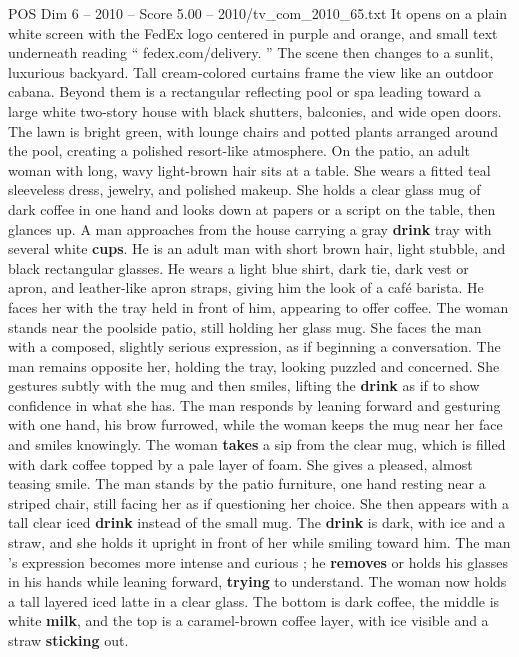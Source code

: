 \begin{textsample}{POS Dim 6 – 2010 – Score 5.00 – 2010/tv\_com\_2010\_65.txt}  \label{ex:f6_pos_089}
It opens on a plain white screen with the FedEx logo centered in purple and orange, and small text underneath reading “ fedex.com/delivery. ” The scene then changes to a sunlit, luxurious backyard.
Tall cream-colored curtains frame the view like an outdoor cabana.
Beyond them is a rectangular reflecting pool or spa leading toward a large white two-story house with black shutters, balconies, and wide open doors.
The lawn is bright green, with lounge chairs and potted plants arranged around the pool, creating a polished resort-like atmosphere.
On the patio, an adult woman with long, wavy light-brown hair sits at a table.
She wears a fitted teal sleeveless dress, jewelry, and polished makeup.
She holds a clear glass mug of dark coffee in one hand and looks down at papers or a script on the table, then glances up.
A man approaches from the house carrying a gray \textbf{drink} tray with several white \textbf{cups}.
He is an adult man with short brown hair, light stubble, and black rectangular glasses.
He wears a light blue shirt, dark tie, dark vest or apron, and leather-like apron straps, giving him the look of a café barista.
He faces her with the tray held in front of him, appearing to offer coffee.
The woman stands near the poolside patio, still holding her glass mug.
She faces the man with a composed, slightly serious expression, as if beginning a conversation.
The man remains opposite her, holding the tray, looking puzzled and concerned.
She gestures subtly with the mug and then smiles, lifting the \textbf{drink} as if to show confidence in what she has.
The man responds by leaning forward and gesturing with one hand, his brow furrowed, while the woman keeps the mug near her face and smiles knowingly.
The woman \textbf{takes} a sip from the clear mug, which is filled with dark coffee topped by a pale layer of foam.
She gives a pleased, almost teasing smile.
The man stands by the patio furniture, one hand resting near a striped chair, still facing her as if questioning her choice.
She then appears with a tall clear iced \textbf{drink} instead of the small mug.
The \textbf{drink} is dark, with ice and a straw, and she holds it upright in front of her while smiling toward him.
The man ’s expression becomes more intense and curious ; he \textbf{removes} or holds his glasses in his hands while leaning forward, \textbf{trying} to understand.
The woman now holds a tall layered iced latte in a clear glass.
The bottom is dark coffee, the middle is white \textbf{milk}, and the top is a caramel-brown coffee layer, with ice visible and a straw \textbf{sticking} out.

\end{textsample}
